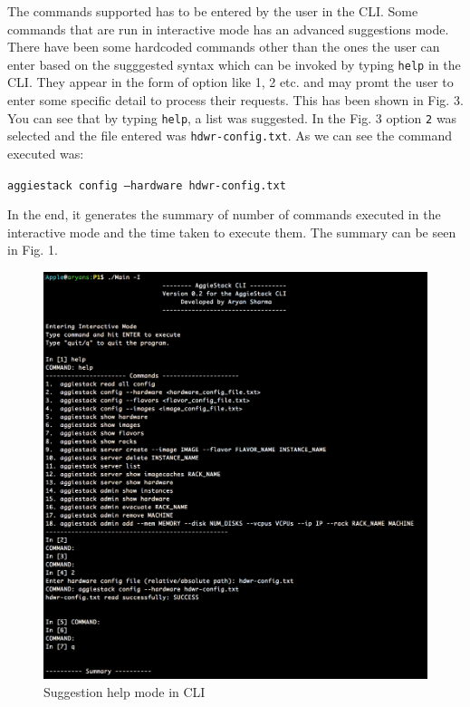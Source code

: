 \documentclass[letterpaper]{article}
\begin{document}
The commands supported has to be entered by the user in the CLI. Some commands that are run in interactive mode has an advanced suggestions mode. There have been some hardcoded commands other than the ones the user can enter based on the sugggested syntax which can be invoked by typing \texttt{help} in the CLI. They appear in the form of option like 1, 2 etc. and may promt the user to enter some specific detail to process their requests. This has been shown in Fig. 3. You can see that by typing \texttt{help}, a list was suggested. In the Fig. 3 option \texttt{2} was selected and the file entered was \texttt{hdwr-config.txt}. As we can see the command executed was:

\vspace{1em}
\texttt{aggiestack config --hardware hdwr-config.txt}
\vspace{1em}

In the end, it generates the summary of number of commands executed in the interactive mode and the time taken to execute them. The summary can be seen in Fig. 1.

\begin{figure} [H]
	\centering
	\includegraphics[width=1\textwidth]{cli3.png}
	\caption{\label{fig:data}Suggestion help mode in CLI}
\end{figure}
\end{document}
